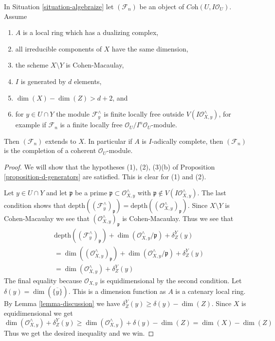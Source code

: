 \begin{lemma}
\label{lemma-interesting-case-final}
In Situation \ref{situation-algebraize} let $(\mathcal{F}_n)$
be an object of $\textit{Coh}(U, I\mathcal{O}_U)$. Assume
\begin{enumerate}
\item $A$ is a local ring which has a dualizing complex,
\item all irreducible components of $X$ have the same dimension,
\item the scheme $X \setminus Y$ is Cohen-Macaulay,
\item $I$ is generated by $d$ elements,
\item $\dim(X) - \dim(Z) > d + 2$, and
\item for $y \in U \cap Y$ the module $\mathcal{F}_y^\wedge$
is finite locally free outside $V(I\mathcal{O}_{X, y}^\wedge)$,
for example if $\mathcal{F}_n$ is a finite locally free
$\mathcal{O}_U/I^n\mathcal{O}_U$-module.
\end{enumerate}
Then $(\mathcal{F}_n)$ extends to $X$. In particular if $A$ is $I$-adically
complete, then $(\mathcal{F}_n)$ is the completion of a coherent
$\mathcal{O}_U$-module.
\end{lemma}

\begin{proof}
We will show that the hypotheses (1), (2), (3)(b) of
Proposition \ref{proposition-d-generators} are satisfied.
This is clear for (1) and (2).

\medskip\noindent
Let $y \in U \cap Y$ and let $\mathfrak p$ be a prime
$\mathfrak p \subset \mathcal{O}_{X, y}^\wedge$ with
$\mathfrak p \not \in V(I\mathcal{O}_{X, y}^\wedge)$.
The last condition shows that
$\text{depth}((\mathcal{F}_y^\wedge)_\mathfrak p) =
\text{depth}((\mathcal{O}_{X, y}^\wedge)_\mathfrak p)$.
Since $X \setminus Y$ is Cohen-Macaulay we see that
$(\mathcal{O}_{X, y}^\wedge)_\mathfrak p$ is Cohen-Macaulay.
Thus we see that
\begin{align*}
& \text{depth}((\mathcal{F}^\wedge_y)_\mathfrak p) +
\dim(\mathcal{O}_{X, y}^\wedge/\mathfrak p) + \delta^Y_Z(y) \\
& =
\dim((\mathcal{O}_{X, y}^\wedge)_\mathfrak p) +
\dim(\mathcal{O}_{X, y}^\wedge/\mathfrak p) + \delta^Y_Z(y) \\
& =
\dim(\mathcal{O}_{X, y}^\wedge) + \delta^Y_Z(y)
\end{align*}
The final equality because $\mathcal{O}_{X, y}$ is equidimensional
by the second condition.
Let $\delta(y) = \dim(\overline{\{y\}})$. This is a dimension function
as $A$ is a catenary local ring.
By Lemma \ref{lemma-discussion}
we have $\delta^Y_Z(y) \geq \delta(y) - \dim(Z)$. Since $X$ is
equidimensional we get
$$
\dim(\mathcal{O}_{X, y}^\wedge) + \delta^Y_Z(y)
\geq \dim(\mathcal{O}_{X, y}^\wedge) + \delta(y) - \dim(Z)
= \dim(X) - \dim(Z)
$$
Thus we get the desired inequality and we win.
\end{proof}

